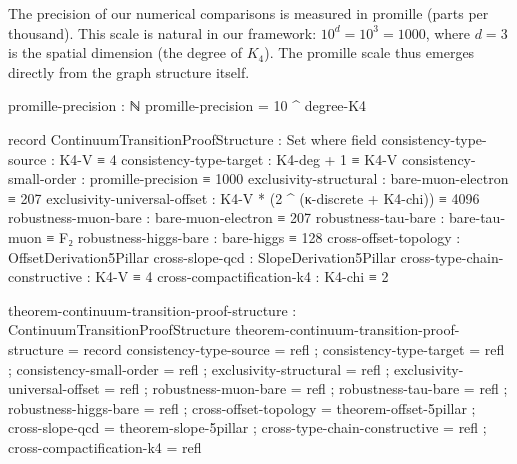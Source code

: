 \documentclass[11pt,a4paper]{book}
\begin{document}
The precision of our numerical comparisons is measured in promille (parts per thousand).
This scale is natural in our framework: $10^d = 10^3 = 1000$, where $d = 3$ is the 
spatial dimension (the degree of $K_4$). The promille scale thus emerges directly from the 
graph structure itself.

\begin{code}
promille-precision : ℕ
promille-precision = 10 ^ degree-K4

record ContinuumTransitionProofStructure : Set where
  field
    consistency-type-source : K4-V ≡ 4
    consistency-type-target : K4-deg + 1 ≡ K4-V
    consistency-small-order : promille-precision ≡ 1000
    exclusivity-structural : bare-muon-electron ≡ 207
    exclusivity-universal-offset : K4-V * (2 ^ (κ-discrete + K4-chi)) ≡ 4096
    robustness-muon-bare : bare-muon-electron ≡ 207
    robustness-tau-bare : bare-tau-muon ≡ F₂
    robustness-higgs-bare : bare-higgs ≡ 128
    cross-offset-topology : OffsetDerivation5Pillar
    cross-slope-qcd : SlopeDerivation5Pillar
    cross-type-chain-constructive : K4-V ≡ 4
    cross-compactification-k4 : K4-chi ≡ 2

theorem-continuum-transition-proof-structure : ContinuumTransitionProofStructure
theorem-continuum-transition-proof-structure = record
  { consistency-type-source = refl
  ; consistency-type-target = refl
  ; consistency-small-order = refl
  ; exclusivity-structural = refl
  ; exclusivity-universal-offset = refl
  ; robustness-muon-bare = refl
  ; robustness-tau-bare = refl
  ; robustness-higgs-bare = refl
  ; cross-offset-topology = theorem-offset-5pillar
  ; cross-slope-qcd = theorem-slope-5pillar
  ; cross-type-chain-constructive = refl
  ; cross-compactification-k4 = refl
  }
\end{code}
\end{document}
